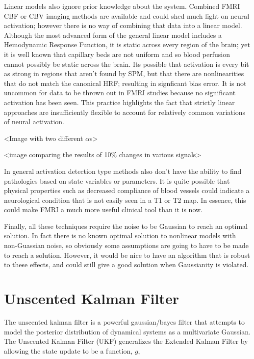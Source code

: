 \documentclass{article}
\begin{document}
Linear models also ignore prior knowledge about the system. Combined FMRI
CBF or CBV imaging methods are available and could shed much light on
neural activation; however there is no way of combining that data into a
linear model. Although the most advanced form of the general linear model includes
a Hemodynamic Response Function, it is static across every region of the brain;
yet it is well known that capillary beds are not uniform and so blood perfusion 
cannot possibly be static across the brain. Its possible that activation is
every bit as strong in regions that aren't found by SPM, but that there are
nonlinearities that do not match the canonical HRF; resulting in signficant bias error. 
It is not uncommon
for data to be thrown out in FMRI studies because no significant activation
has been seen. This practice highlights the fact that strictly linear
approaches are insufficiently flexible to account for relatively common
variations of neural activation. 

<Image with two different $\alpha$s>

<image comparing the results of 10\% changes in various signals>

In general activation detection type methods also don't have the ability 
to find pathologies based on state variables or parameters.  It
is quite possible that physical properties such as decreased compliance of
blood vessels could indicate a neurological condition that is not easily
seen in a T1 or T2 map. In essence, this could make FMRI a much more 
useful clinical tool than it is now. 

Finally, all these techniques require the noise to be Gaussian to reach
an optimal solution. In fact there is no known optimal solution to
nonlinear models with non-Guassian noise, so obviously some assumptions
are going to have to be made to reach a solution. However, it would be
nice to have an algorithm that is robust to these effects, and could
still give a good solution when Gaussianity is violated.

\section{Unscented Kalman Filter}
The unscented kalman filter is a powerful gaussian/bayes filter that attempts
to model the posterior distribution of dynamical systems as a multivariate
Gaussian. The Unscented Kalman Filter (UKF) generalizes the Extended Kalman
Filter by allowing the state update to be a function, $g$,
\end{document}
